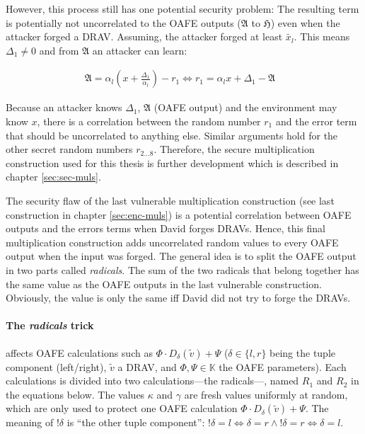 However, this process still has one potential security problem: The resulting
term is potentially not uncorrelated to the OAFE outputs ($\mathfrak{A}$ to
$\mathfrak{H}$) even when the attacker forged a DRAV. Assuming, the attacker
forged at least $\widetilde{x_l}$. This means $\Delta_1 \neq 0$ and from
$\mathfrak{A}$ an attacker can learn:

\begin{align*}
  \mathfrak{A} = \alpha_l (x+\frac{\Delta_1}{\alpha_l}) - r_1
  \Leftrightarrow r_1 = \alpha_l x + \Delta_1 - \mathfrak{A} &
\end{align*}

Because an attacker knows $\Delta_1$,  $\mathfrak{A}$ (OAFE output) and the
environment may know $x$, there is a correlation between the random number $r_1$
and the error term that should be uncorrelated to anything else. Similar
arguments hold for the other secret random numbers $r_{2 \ldots 8}$. Therefore,
the secure multiplication construction used for this thesis is further
development which is described in chapter \ref{sec:sec-muls}.


\label{sec:sec-muls}

The security flaw of the last vulnerable multiplication construction (see last
construction in chapter \ref{sec:enc-muls}) is a potential correlation between
OAFE outputs and the errors terms when David forges DRAVs. Hence, this final
multiplication construction adds uncorrelated random values to every OAFE output
when the input was forged. The general idea is to split the OAFE output in two
parts called \emph{radicals}. The sum of the two radicals that belong together
has the same value as the OAFE outputs in the last vulnerable construction.
Obviously, the value is only the same iff David did not try to forge the DRAVs.

\paragraph{The \emph{radicals} trick} affects OAFE calculations such as $\Phi
\cdot D_\delta(\widetilde{v}) + \Psi$ ($\delta \in \{l, r\}$ being the tuple
component (left/right), $\widetilde{v}$ a DRAV, and $\Phi, \Psi \in \mathbb{K}$
the OAFE parameters). Each calculations is divided into two calculations---the
radicals---, named $R_1$ and $R_2$ in the equations below. The values $\kappa$
and $\gamma$ are fresh values uniformly at random, which are only used to
protect one OAFE calculation $\Phi \cdot D_\delta(\widetilde{v}) + \Psi$. The
meaning of $!\delta$ is ``the other tuple component'': $!\delta = l
\Leftrightarrow \delta = r \wedge !\delta = r \Leftrightarrow \delta = l$.

